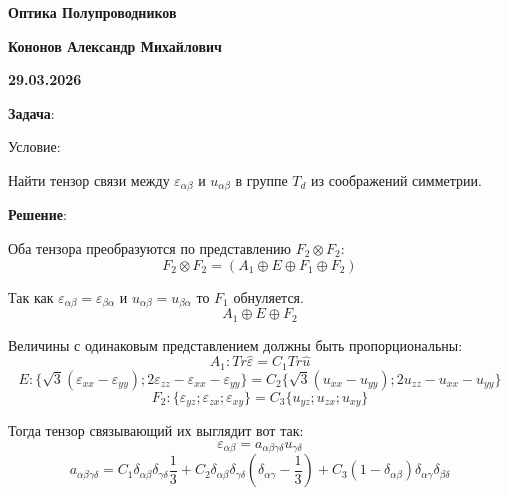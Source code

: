 \documentclass[12pt]{article}
\begin{document}
\begin{large}
\begin{center}
\LARGE \textbf{Оптика Полупроводников}
\par
\LARGE \textbf{Кононов Александр Михайлович}
\par
    \textbf{29.03.2026}
\end{center}
\par \textbf{Задача}:
\par Условие:
\par Найти тензор связи между $\varepsilon_{\alpha \beta}$ и $u_{\alpha \beta}$ в группе $T_d$ из соображений симметрии.
\par
\par \textbf{Решение}:
\par Оба тензора преобразуются по представлению $F_2 \otimes F_2$:
\[
    F_2 \otimes F_2 = (A_1 \oplus E \oplus F_1 \oplus F_2)
\]
\par Так как $\varepsilon_{\alpha \beta} = \varepsilon_{ \beta \alpha}$ и $u_{\alpha \beta} = u_{ \beta \alpha}$ то $F_1$ обнуляется.
\[
    A_1 \oplus E \oplus F_2
\]
\par Величины с одинаковым представлением должны быть пропорциональны:
\[
    A_1: Tr\hat{\varepsilon} = C_1 Tr\hat{u}
\]
\[
    E: \{ \sqrt{3} \left( \varepsilon_{xx} - \varepsilon_{yy} \right) ; 2\varepsilon_{zz} - \varepsilon_{xx} - \varepsilon_{yy} \} = C_2 \{ \sqrt{3} \left( u_{xx} - u_{yy} \right) ; 2u_{zz} - u_{xx} - u_{yy} \}
\]
\[
    F_2: \{ \varepsilon_{yz} ; \varepsilon_{zx} ; \varepsilon_{xy} \} = C_3 \{ u_{yz} ; u_{zx} ; u_{xy} \}
\]
\par Тогда тензор связывающий их выглядит вот так:
\[
    \varepsilon_{\alpha \beta } = a_{\alpha \beta \gamma \delta } u_{\gamma \delta }
\]
\[
    a_{\alpha \beta \gamma \delta } = C_1 \delta_{\alpha \beta} \delta_{\gamma \delta} \frac{1}{3} + C_2 \delta_{\alpha \beta} \delta_{\gamma \delta} \left( \delta_{\alpha \gamma} - \frac{1}{3} \right) + C_3 \left( 1 - \delta_{\alpha \beta} \right) \delta_{\alpha \gamma} \delta_{\beta \delta}
\]

\par
\end{large}
\end{document}
